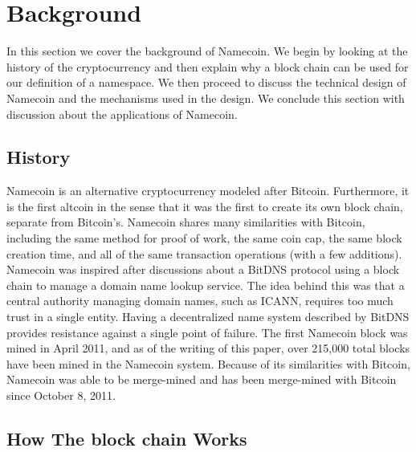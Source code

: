 \section{Background}
\label{sec:background}

In this section we cover the background of Namecoin. We begin by looking at the history of the cryptocurrency and then explain why a block chain can be used for our definition of a namespace. We then proceed to discuss the technical design of Namecoin and the mechanisms used in the design. We conclude this section with discussion about the applications of Namecoin.

\subsection{History}

Namecoin is an alternative cryptocurrency modeled after Bitcoin\cite{nakamoto2008bitcoin}. Furthermore, it is the first altcoin in the sense that it was the first to create its own block chain, separate from Bitcoin's.  Namecoin shares many similarities with Bitcoin, including the same method for proof of work, the same coin cap, the same block creation time, and all of the same transaction operations (with a few additions). Namecoin was inspired after discussions about a BitDNS\cite{bitdns} protocol using a block chain to manage a domain name lookup service. The idea behind this was that a central authority managing domain names, such as ICANN, requires too much trust in a single entity. Having a decentralized name system described by BitDNS provides resistance against a single point of failure. The first Namecoin block was mined in April 2011, and as of the writing of this paper, over 215,000 total blocks have been mined in the Namecoin system. Because of its similarities with Bitcoin, Namecoin was able to be merge-mined and has been merge-mined with Bitcoin since October 8, 2011. 

\subsection{How The block chain Works}

